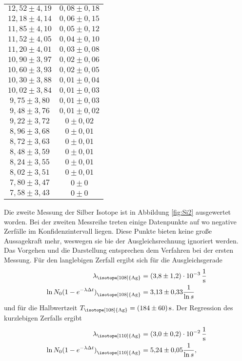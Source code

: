 \begin{table}[H]
\begin{tabular}{c c}
      $12,52 \pm 4,19$ & $0,08 \pm 0,18$ \\
      $12,18 \pm 4,14$ & $0,06 \pm 0,15$ \\
      $11,85 \pm 4,10$ & $0,05 \pm 0,12$ \\
      $11,52 \pm 4,05$ & $0,04 \pm 0,10$ \\
      $11,20 \pm 4,01$ & $0,03 \pm 0,08$ \\
      $10,90 \pm 3,97$ & $0,02 \pm 0,06$ \\
      $10,60 \pm 3,93$ & $0,02 \pm 0,05$ \\
      $10,30 \pm 3,88$ & $0,01 \pm 0,04$ \\
      $10,02 \pm 3,84$ & $0,01 \pm 0,03$ \\
      $9,75 \pm 3,80$ & $0,01 \pm 0,03$ \\
      $9,48 \pm 3,76$ & $0,01 \pm 0,02$ \\
      $9,22 \pm 3,72$ & $0 \pm 0,02$ \\
      $8,96 \pm 3,68$ & $0 \pm 0,01$ \\
      $8,72 \pm 3,63$ & $0 \pm 0,01$ \\
      $8,48 \pm 3,59$ & $0 \pm 0,01$ \\
      $8,24 \pm 3,55$ & $0 \pm 0,01$ \\
      $8,02 \pm 3,51$ & $0 \pm 0,01$ \\
      $7,80 \pm 3,47$ & $0 \pm 0$ \\
      $7,58 \pm 3,43$ & $0 \pm 0$ \\
      \bottomrule
  \end{tabular}
\end{table}
Die zweite Messung der Silber Isotope ist in Abbildung \ref{fig:Si2} ausgewertet worden.
Bei der zweiten Messreihe treten einige Datenpunkte auf wo negative Zerfälle im Konfidenzintervall liegen.
Diese Punkte bieten keine große Aussagekraft mehr, weswegen sie bie der Ausgleichsrechnung ignoriert werden.
Das Vorgehen und die Darstellung entsprechen dem Verfahren bei der ersten Messung.
Für den langlebigen Zerfall ergibt sich für die Ausgleichsgerade
\begin{align*}
  \lambda_\text{\isotope[108]{Ag}}&=\qty{3.8(1.2)e-3}{\per\s}\\
  \ln{N_0(1-e^{-\lambda \Delta t})}_\text{\isotope[108]{Ag}}&=\num{3.13(0.33)}\frac{1}{\ln{s}}
\end{align*}
und für die Halbwertzeit $T_\text{\isotope[108]{Ag}}=\qty{184(60)}{\second}$.
Der Regression des kurzlebigen Zerfalls ergibt
\begin{align*}
  \lambda_\text{\isotope[110]{Ag}}&=\qty{3.0(0.2)e-2}{\per\s}\\
  \ln{N_0(1-e^{-\lambda \Delta t})}_\text{\isotope[110]{Ag}}&=\num{5.24(0.05)}\frac{1}{\ln{s}},
\end{align*}
